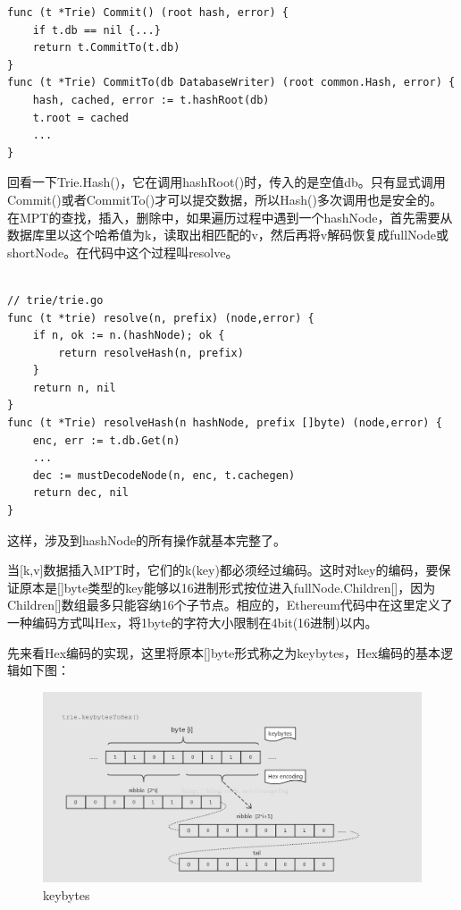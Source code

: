 \documentclass[UTF8]{ctexart}
\begin{document}
\begin{lstlisting}
func (t *Trie) Commit() (root hash, error) {
    if t.db == nil {...}
    return t.CommitTo(t.db)
}
func (t *Trie) CommitTo(db DatabaseWriter) (root common.Hash, error) {
    hash, cached, error := t.hashRoot(db)
    t.root = cached
    ...
}

\end{lstlisting}

回看一下Trie.Hash()，它在调用hashRoot()时，传入的是空值db。只有显式调用Commit()或者CommitTo()才可以提交数据，所以Hash()多次调用也是安全的。
在MPT的查找，插入，删除中，如果遍历过程中遇到一个hashNode，首先需要从数据库里以这个哈希值为k，读取出相匹配的v，然后再将v解码恢复成fullNode或shortNode。在代码中这个过程叫resolve。

\begin{lstlisting}

// trie/trie.go
func (t *trie) resolve(n, prefix) (node,error) {
    if n, ok := n.(hashNode); ok {
        return resolveHash(n, prefix)
    }
    return n, nil
}
func (t *Trie) resolveHash(n hashNode, prefix []byte) (node,error) {
    enc, err := t.db.Get(n)
    ...
    dec := mustDecodeNode(n, enc, t.cachegen)
    return dec, nil
}

\end{lstlisting}

这样，涉及到hashNode的所有操作就基本完整了。


当[k,v]数据插入MPT时，它们的k(key)都必须经过编码。这时对key的编码，要保证原本是[]byte类型的key能够以16进制形式按位进入fullNode.Children[]，因为Children[]数组最多只能容纳16个子节点。相应的，Ethereum代码中在这里定义了一种编码方式叫Hex，将1byte的字符大小限制在4bit(16进制)以内。

先来看Hex编码的实现，这里将原本[]byte形式称之为keybytes，Hex编码的基本逻辑如下图：

\begin{figure}
	\centering
	\includegraphics[scale=0.45]{keybytes.png}
	\caption{keybytes}
	\label{keybytes}
\end{figure}
\end{document}
